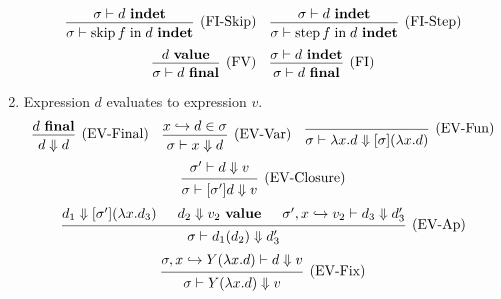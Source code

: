 \documentclass{article}
\newcommand{\evalsto}{\mathrel{\mathop{\Downarrow}}}
\newcommand{\hooksto}{\mathrel{\mathop{\hookrightarrow}}}
\newcommand{\entails}{\mathrel{\mathop{\vdash}}}
\newcommand{\final}{~\mathbf{final}}
\newcommand{\ival}{~\mathbf{value}}
\newcommand{\indet}{~\mathbf{indet}}
\DeclareMathOperator{\fskip}{skip}
\DeclareMathOperator{\fstep}{step}
\newcommand{\fin}{\mathrel{\mathop{\text{in}}}}
\begin{document}
\begin{enumerate}
\[    \]
    \[
      \begin{prooftree}
        \hypo{\sigma \entails d \indet}
        \infer1[(FI-Skip)]{\sigma \entails \fskip f \fin d \indet}
      \end{prooftree}
      \quad
      \begin{prooftree}
        \hypo{\sigma \entails d \indet}
        \infer1[(FI-Step)]{\sigma \entails \fstep f \fin d \indet}
      \end{prooftree}
    \]
    \[
      \begin{prooftree}
        \hypo{d \ival}
        \infer1[(FV)]{\sigma \entails d \final}
      \end{prooftree}
      \quad
      \begin{prooftree}
        \hypo{\sigma \entails d \indet}
        \infer1[(FI)]{\sigma \entails d \final}
      \end{prooftree}
    \]
  \item \fbox{\(d \evalsto v\)} Expression \(d\) evaluates to expression \(v\).
    \[
      \begin{prooftree}
        \hypo{d \final}
        \infer1[(EV-Final)]{d \evalsto d}
      \end{prooftree}
      \quad
      \begin{prooftree}
        \hypo{x \hooksto d \in \sigma}
        \infer1[(EV-Var)]{\sigma \entails x \evalsto d}
      \end{prooftree}
      \quad
      \begin{prooftree}
        \infer0[(EV-Fun)]{\sigma \entails \lambda x . d \evalsto [\sigma] (\lambda x . d)}
      \end{prooftree}
    \]
    \[
      \begin{prooftree}
        \hypo{\sigma' \entails d \evalsto v}
        \infer1[(EV-Closure)]{\sigma \entails [\sigma'] d \evalsto v}
      \end{prooftree}
    \]
    \[
      \begin{prooftree}
        \hypo{d_1 \evalsto [\sigma'] (\lambda x . d_3)}
        \hypo{d_2 \evalsto v_2 \ival}
        \hypo{\sigma', x \hooksto v_2 \entails d_3 \evalsto d_3'}
        \infer3[(EV-Ap)]{\sigma \entails d_1 (d_2) \evalsto d_3'}
      \end{prooftree}
    \]
    \[
      \begin{prooftree}
        \hypo{\sigma, x \hooksto Y (\lambda x . d) \entails d \evalsto v}
        \infer1[(EV-Fix)]{\sigma \entails Y (\lambda x . d) \evalsto v}
      \end{prooftree}
\]
\end{enumerate}
\end{document}
